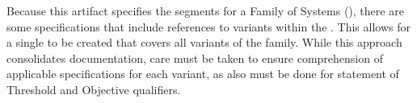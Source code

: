 

Because this artifact specifies the segments for a Family of Systems (\FoS), there are some specifications that include references to variants within the \FoS.
This allows for a single \SSS to be created that covers all variants of the family.
While this approach consolidates documentation, care must be taken to ensure comprehension of applicable specifications for each variant, as also must be done for statement of Threshold and Objective qualifiers. 